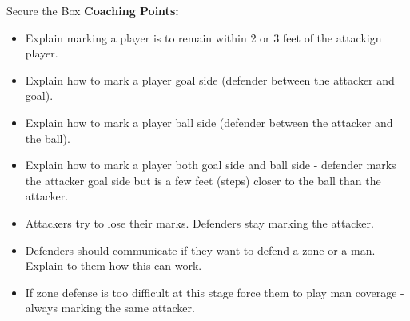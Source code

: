 \begin{evenBlock}{Secure the Box}
\textbf{Coaching Points:}
\begin{itemize}
    \setlength{\itemsep}{0pt}
    \setlength{\parskip}{0pt}
    \setlength{\parsep}{0pt}
    \item Explain marking a player is to remain within 2 or 3 feet of the attackign player.
    \item Explain how to mark a player goal side (defender between the attacker and goal).
    \item Explain how to mark a player ball side (defender between the attacker and the ball).
    \item Explain how to mark a player both goal side and ball side - defender marks the attacker goal side but is a few feet (steps) closer to the ball than the attacker.
    \item Attackers try to lose their marks.  Defenders stay marking the attacker.
    \item Defenders should communicate if they want to defend a zone or a man.  Explain to them how this can work.
    \item If zone defense is too difficult at this stage force them to play man coverage - always marking the same attacker.
\end{itemize}
\end{evenBlock}